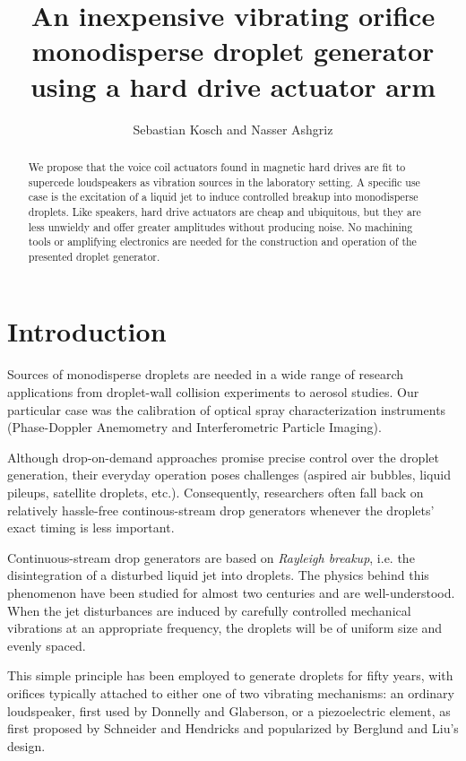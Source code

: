 \documentclass[aip,rsi,reprint,graphicx]{revtex4-1} %
\begin{document}
\title{An inexpensive vibrating orifice monodisperse droplet generator using a hard
drive actuator arm}
\author{Sebastian Kosch and Nasser Ashgriz}
\begin{abstract}
    We propose that the voice coil actuators found in magnetic hard drives are
    fit to supercede loudspeakers as vibration sources in the laboratory setting. A
    specific use case is the excitation of a liquid jet to induce controlled
    breakup into monodisperse droplets. Like speakers, hard drive actuators are cheap and
    ubiquitous, but they are less unwieldy and offer greater amplitudes without
    producing noise. No machining tools or amplifying electronics
    are needed for the construction and operation of the presented droplet generator.
\end{abstract}
\maketitle
\section{Introduction}
Sources of monodisperse droplets are needed in a wide range of research
applications from droplet-wall collision experiments\cite{Mundo95} to aerosol
studies\cite{Liu74}. Our particular case was the calibration of optical spray
characterization instruments (Phase-Doppler Anemometry and Interferometric
Particle Imaging).

Although drop-on-demand approaches promise precise control over the droplet
generation, their everyday operation poses challenges (aspired air bubbles,
liquid pileups, satellite droplets, etc.). Consequently, researchers often fall
back on relatively hassle-free continous-stream drop generators whenever the
droplets' exact timing is less important.

Continuous-stream drop generators are based on \emph{Rayleigh breakup},
i.e. the disintegration of a disturbed liquid jet into droplets. The physics
behind this phenomenon have been studied for almost two centuries\cite{Savart33,
Rayleigh79} and are well-understood. When the jet disturbances are induced by
carefully controlled mechanical vibrations at an appropriate frequency, the
droplets will be of uniform size and evenly spaced.

This simple principle has been employed to generate droplets for fifty years,
with orifices typically attached to either one of two vibrating mechanisms: an
ordinary loudspeaker, first used by Donnelly and Glaberson\cite{Donnelly66}, or
a piezoelectric element, as first proposed by Schneider and
Hendricks\cite{Schneider64} and popularized by Berglund and Liu's
design\cite{Berglund73}.
\end{document}
